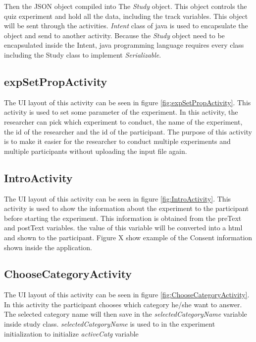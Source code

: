 Then the JSON object compiled into The \textit{Study} object. This object controls the quiz experiment and hold all the data, including the track variables.
This object will be sent through the activities.
\textit{Intent} class of java is used to encapsulate the object and send to another activity.
Because the \textit{Study} object need to be encapsulated inside the Intent,
 java programming language requires every class including the Study class to implement \textit{Serializable}.

%

\subsection{expSetPropActivity}
The UI layout of this activity can be seen in figure \ref{fig:expSetPropActivity}.
This activity is used to set some parameter of the experiment. In this activity, the researcher can pick which experiment to conduct, the name of the experiment,
the id of the researcher and the id of the participant.
The purpose of this activity is to make it easier for the researcher to conduct multiple experiments and multiple participants without uploading the input file again.

\subsection{IntroActivity}
The UI layout of this activity can be seen in figure \ref{fig:IntroActivity}.
This activity is used to show the information about the experiment to the participant before starting the experiment.
This information is obtained from the preText and postText variables. the value of this variable will be converted into a html and shown to the participant.
Figure X show example of the Consent information shown inside the application.

\subsection{ChooseCategoryActivity}
The UI layout of this activity can be seen in figure \ref{fig:ChooseCategoryActivity}.
In this activity the participant chooses which category he/she want to answer.
The selected category name will then save in the \textit{selectedCategoryName} variable inside study class.
\textit{selectedCategoryName} is used to in the experiment initialization to initialize \textit{activeCatg} variable


